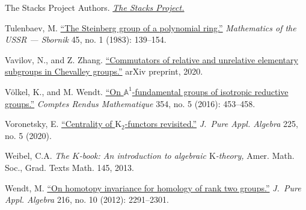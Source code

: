 \documentclass[oneside, 11pt]{amsart}
\numberwithin{equation}{section}
\newcommand{\K}{{\mathrm{K}}}
\theoremstyle{definition}
\theoremstyle{definition}
\theoremstyle{remark}
\begin{document}
\begin{thebibliography}{0}
The Stacks Project Authors.
\href{https://stacks.math.columbia.edu}{\textit{The Stacks Project.}}

Tulenbaev, M.
\href{http://dx.doi.org/10.1070/SM1983v045n01ABEH002591}{``The Steinberg group of a polynomial ring.''}
\textit{Mathematics of the USSR --- Sbornik} {45}, no. {1} (1983): {139--154}.

Vavilov, N., and Z. Zhang.
\href{https://arxiv.org/abs/2003.07230}{``Commutators of relative and unrelative elementary subgroups in Chevalley groups.''} arXiv preprint, 2020.
  
V\"olkel, K., and M. Wendt.
\href{http://dx.doi.org/10.1016/j.crma.2016.01.026}{``On $\mathbb{A}^1$-fundamental groups of isotropic reductive groups.''}
\textit{Comptes Rendus Mathematique} 354, no. 5 (2016): 453--458.

Voronetsky, E.
\href{http://dx.doi.org/10.1016/j.jpaa.2020.106547}{``Centrality of $\K_2$-functors revisited.''}
\textit{J.~Pure Appl. Algebra} 225, no. 5 (2020).

Weibel, C.A.
\textit{The $K$-book: An introduction to algebraic $\K$-theory,}
Amer. Math. Soc., Grad. Texts Math. 145, 2013.

Wendt, M.
\href{http://dx.doi.org/10.1016/j.jpaa.2012.03.004}{``On homotopy invariance for homology of rank two groups.''}
\textit{J.~Pure Appl. Algebra} {216}, no. {10} (2012): {2291--2301}.
\end{thebibliography}
\end{document}

